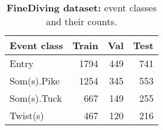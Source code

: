 \documentclass[runningheads]{llncs}
\newcommand{\finediving}{{FineDiving}\xspace}
\begin{document}
\begin{table}[p]
    \centering
    \caption{{\bf \finediving dataset:} event classes and their counts.}
    \label{tab:finediving_class}
    {
    \begin{tabularx}{0.38\columnwidth}{lrrr}
        \toprule
        \multicolumn{1}{c}{Event class} & Train & Val & Test \\
        \midrule
        Entry
            & 1794 & 449 & 741 \\
        Som(s).Pike
            & 1254 & 345 & 553 \\
        Som(s).Tuck
            & 667 & 149 & 255 \\
        Twist(s)
            & 467 & 120 & 216 \\
        \bottomrule
    \end{tabularx}
    }
\end{table}



\def\checkmark{\tikz\fill[scale=0.25](0,.35) -- (.25,0) -- (1,.7) -- (.25,.15) -- cycle;}
\end{document}
